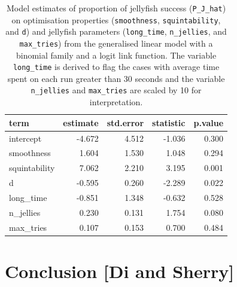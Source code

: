 \documentclass[
  number,
  preprint,
  3p]{elsarticle}
\begin{document}
\begin{longtable}[t]{|>{}lrrr>{}r|}

\caption{\label{tbl-mod-output}Model estimates of proportion of
jellyfish success (\texttt{P\_J\_hat}) on optimisation properties
(\texttt{smoothness}, \texttt{squintability}, and \texttt{d}) and
jellyfish parameters (\texttt{long\_time}, \texttt{n\_jellies}, and
\texttt{max\_tries}) from the generalised linear model with a binomial
family and a logit link function. The variable \texttt{long\_time} is
derived to flag the cases with average time spent on each run greater
than 30 seconds and the variable \texttt{n\_jellies} and
\texttt{max\_tries} are scaled by 10 for interpretation.}

\tabularnewline

\toprule
term & estimate & std.error & statistic & p.value\\
\midrule
intercept & -4.672 & 4.512 & -1.036 & 0.300\\
smoothness & 1.604 & 1.530 & 1.048 & 0.294\\
squintability & 7.062 & 2.210 & 3.195 & 0.001\\
d & -0.595 & 0.260 & -2.289 & 0.022\\
long\_time & -0.851 & 1.348 & -0.632 & 0.528\\
\addlinespace
n\_jellies & 0.230 & 0.131 & 1.754 & 0.080\\
max\_tries & 0.107 & 0.153 & 0.700 & 0.484\\
\bottomrule

\end{longtable}

\section{Conclusion {[}Di and Sherry{]}}\label{sec-conclusion}


\renewcommand\refname{References}
  
\end{document}
